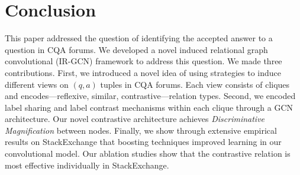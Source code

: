 \section{Conclusion}
\label{sec:conclusion}

This paper addressed the question of identifying the accepted answer to a question in CQA forums. We developed a novel induced relational graph convolutional (IR-GCN) framework to address this question. We made three contributions. First, we introduced a novel idea of using strategies to induce different views on $(q,a)$ tuples in CQA forums. Each view consists of cliques and encodes---reflexive, similar, contrastive---relation types. Second, we encoded label sharing and label contrast mechanisms within each clique through a GCN architecture.  Our novel contrastive architecture achieves \emph{Discriminative Magnification} between nodes. Finally, we show through extensive empirical results on StackExchange that boosting techniques improved learning in our convolutional model.
Our ablation studies show that the contrastive relation is most effective individually in StackExchange. 
